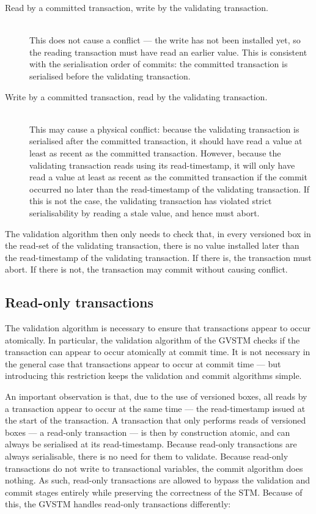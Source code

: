 \documentclass[12pt,a4paper,oneside,openright]{report}
\begin{document}
\begin{description}
\item[Read by a committed transaction, write by the validating transaction.] \hfill\\
  This does not cause a conflict --- the write has not been installed
  yet, so the reading transaction must have read an earlier
  value. This is consistent with the serialisation order of commits:
  the committed transaction is serialised before the validating
  transaction.
\item[Write by a committed transaction, read by the validating transaction.] \hfill\\
  This may cause a physical conflict: because the validating
  transaction is serialised after the committed transaction, it should
  have read a value at least as recent as the committed
  transaction. However, because the validating transaction reads using
  its read-timestamp, it will only have read a value at least as
  recent as the committed transaction if the commit occurred no later
  than the read-timestamp of the validating transaction. If this is
  not the case, the validating transaction has violated strict
  serialisability by reading a stale value, and hence must abort.
\end{description}
The validation algorithm then only needs to check that, in every
versioned box in the read-set of the validating transaction, there is
no value installed later than the read-timestamp of the validating
transaction. If there is, the transaction must abort. If there is not,
the transaction may commit without causing conflict.

\subsection{Read-only transactions}
\label{sec:impl:read-only-trans}

The validation algorithm is necessary to ensure that transactions
appear to occur atomically. In particular, the validation algorithm of
the GVSTM checks if the transaction can appear to occur atomically at
commit time. It is not necessary in the general case that transactions
appear to occur at commit time --- but introducing this restriction
keeps the validation and commit algorithms simple.

An important observation is that, due to the use of versioned boxes,
all reads by a transaction appear to occur at the same time --- the
read-timestamp issued at the start of the transaction. A transaction
that only performs reads of versioned boxes --- a read-only
transaction --- is then by construction atomic, and can always be
serialised at its read-timestamp. Because read-only transactions are
always serialisable, there is no need for them to validate. Because
read-only transactions do not write to transactional variables, the
commit algorithm does nothing. As such, read-only transactions are
allowed to bypass the validation and commit stages entirely while
preserving the correctness of the STM. Because of this, the GVSTM
handles read-only transactions differently:
\end{document}

